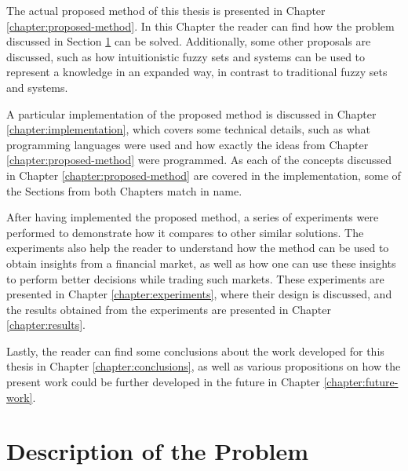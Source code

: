 The actual proposed method of this thesis is presented in Chapter
\ref{chapter:proposed-method}. In this Chapter the reader can find how the
problem discussed in Section \ref{section:description-of-the-problem} can be
solved. Additionally, some other proposals are discussed, such as how
intuitionistic fuzzy sets and systems can be used to represent a knowledge in an
expanded way, in contrast to traditional fuzzy sets and systems.

A particular implementation of the proposed method is discussed in Chapter
\ref{chapter:implementation}, which covers some technical details, such as what
programming languages were used and how exactly the ideas from Chapter
\ref{chapter:proposed-method} were programmed. As each of the concepts discussed
in Chapter \ref{chapter:proposed-method} are covered in the implementation, some
of the Sections from both Chapters match in name.

After having implemented the proposed method, a series of experiments were
performed to demonstrate how it compares to other similar solutions. The
experiments also help the reader to understand how the method can be used to
obtain insights from a financial market, as well as how one can use these
insights to perform better decisions while trading such markets. These
experiments are presented in Chapter \ref{chapter:experiments}, where their
design is discussed, and the results obtained from the experiments are presented
in Chapter \ref{chapter:results}.

Lastly, the reader can find some conclusions about the work developed for this
thesis in Chapter \ref{chapter:conclusions}, as well as various propositions on
how the present work could be further developed in the future in Chapter
\ref{chapter:future-work}.

\section{Description of the Problem}
\label{section:description-of-the-problem}


